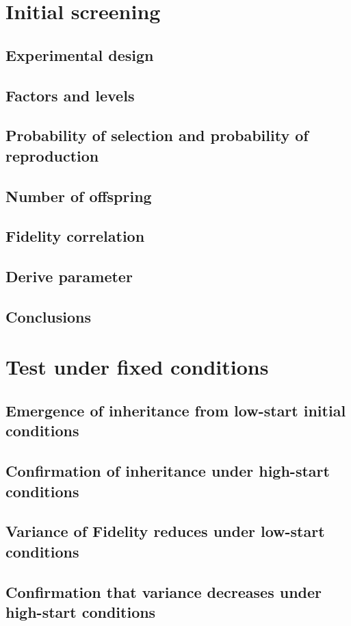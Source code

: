 \documentclass[]{report}
\begin{document}
\chapter{Initial screening}
\section{Experimental design}
\section{Factors and levels}
\section{Probability of selection and probability of reproduction}
\section{Number of offspring}
\section{Fidelity correlation}
\section{Derive parameter}
\section{Conclusions}

\chapter{Test under fixed conditions}
\section{Emergence of inheritance from low-start initial conditions}
\section{Confirmation of inheritance under high-start conditions}
\section{Variance of Fidelity reduces under low-start conditions}
\section{Confirmation that variance decreases under high-start conditions}
\end{document}
